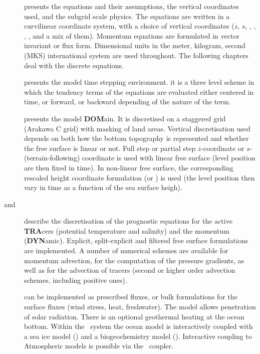 \begin{description}
\item [] presents the equations and their assumptions, the vertical coordinates used,
and the subgrid scale physics.
The equations are written in a curvilinear coordinate system, with a choice of vertical coordinates
($z$, $s$, \zstar, \sstar, \ztilde, \stilde, and a mix of them).
Momentum equations are formulated in vector invariant or flux form.
Dimensional units in the meter, kilogram, second (MKS) international system are used throughout.
The following chapters deal with the discrete equations.
\item [] presents the model time stepping environment.
it is a three level scheme in which the tendency terms of the equations are evaluated either
centered in time, or forward, or backward depending of the nature of the term.
\item [] presents the model \textbf{DOM}ain.
It is discretised on a staggered grid (Arakawa C grid) with masking of land areas.
Vertical discretisation used depends on both how the bottom topography is represented and whether
the free surface is linear or not.
Full step or partial step $z$-coordinate or $s$- (terrain-following) coordinate is used with
linear free surface (level position are then fixed in time).
In non-linear free surface, the corresponding rescaled height coordinate formulation
(\zstar or \sstar) is used
(the level position then vary in time as a function of the sea surface heigh).
\item [ and ] describe the discretisation of
the prognostic equations for the active \textbf{TRA}cers (potential temperature and salinity) and
the momentum (\textbf{DYN}amic).
Explicit, split-explicit and filtered free surface formulations are implemented.
A number of numerical schemes are available for momentum advection,
for the computation of the pressure gradients, as well as for the advection of tracers
(second or higher order advection schemes, including positive ones).
\item [] can be implemented as prescribed fluxes,
or bulk formulations for the surface fluxes (wind stress, heat, freshwater).
The model allows penetration of solar radiation.
There is an optional geothermal heating at the ocean bottom.
Within the \NEMO\ system the ocean model is interactively coupled with
a sea ice model (\SIcube) and a biogeochemistry model (\PISCES).
Interactive coupling to Atmospheric models is possible via the \OASIS\ coupler.

\end{description}
